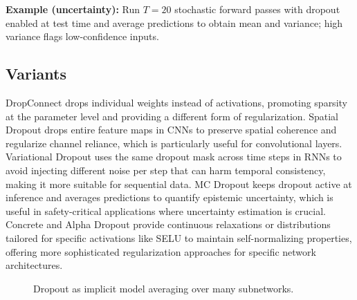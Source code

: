 \begin{example}
\textbf{Example (uncertainty):} Run $T=20$ stochastic forward passes with dropout enabled at test time and average predictions to obtain mean and variance; high variance flags low-confidence inputs.
\end{example}

\subsection{Variants}

DropConnect drops individual weights instead of activations, promoting sparsity at the parameter level and providing a different form of regularization. Spatial Dropout drops entire feature maps in CNNs to preserve spatial coherence and regularize channel reliance, which is particularly useful for convolutional layers. Variational Dropout uses the same dropout mask across time steps in RNNs to avoid injecting different noise per step that can harm temporal consistency, making it more suitable for sequential data. MC Dropout keeps dropout active at inference and averages predictions to quantify epistemic uncertainty, which is useful in safety-critical applications where uncertainty estimation is crucial. Concrete and Alpha Dropout provide continuous relaxations or distributions tailored for specific activations like SELU to maintain self-normalizing properties, offering more sophisticated regularization approaches for specific network architectures.

\begin{figure}[htbp]
\centering
{}
\caption{Dropout as implicit model averaging over many subnetworks.}
\label{fig:dropout-ensemble}
\end{figure}

